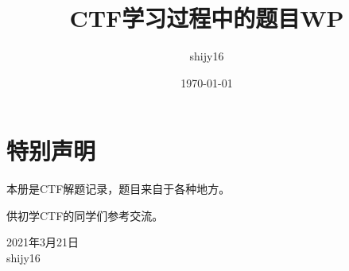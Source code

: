 \documentclass[cn,11pt,chinese]{elegantbook}
\title{CTF学习过程中的题目WP}
\author{shijy16}
\date{\today}
\begin{document}
\maketitle

\chapter*{特别声明}

本册是CTF解题记录，题目来自于各种地方。

供初学CTF的同学们参考交流。

\vskip 1.5cm

\begin{flushright}
2021年3月21日\\
shijy16
\end{flushright}


\tableofcontents
\setcounter{page}{1}




\end{document}
